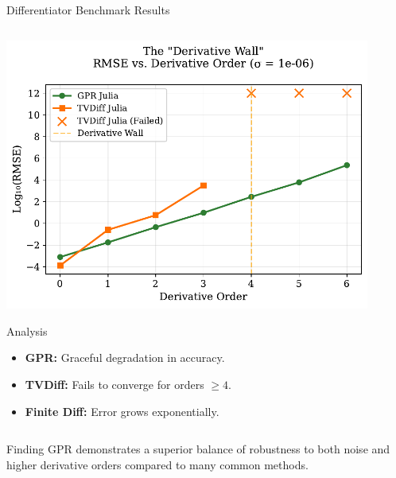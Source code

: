 \documentclass[aspectratio=169]{beamer}
\begin{document}
\begin{frame}{Differentiator Benchmark Results}
\begin{columns}[T]
\begin{column}{0.48\textwidth}
            \includegraphics[width=0.9\textwidth]{derivative_wall.pdf}
            \vspace{0.5em}
            \begin{block}{\tiny Analysis}
            \begin{itemize}
                \item \textbf{GPR:} Graceful degradation in accuracy.
                \item \textbf{TVDiff:} Fails to converge for orders $\ge 4$.
                \item \textbf{Finite Diff:} Error grows exponentially.
            \end{itemize}
            \end{block}
        \end{column}
    \end{columns}
    \vspace{1em}
    \begin{alertblock}{Finding}
        \centering
        \small GPR demonstrates a superior balance of robustness to both noise and higher derivative orders compared to many common methods.
    \end{alertblock}
\end{frame}
\end{document}
